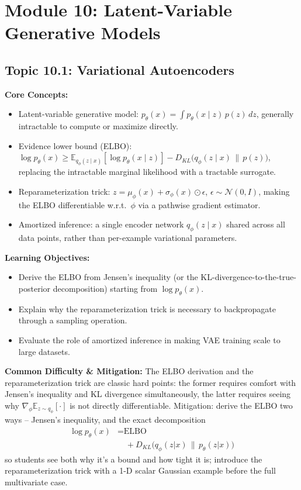 \documentclass[11pt]{article}
\begin{document}
\section{Module 10: Latent-Variable Generative Models}

\subsection{Topic 10.1: Variational Autoencoders}

\textbf{Core Concepts:}
\begin{itemize}
  \item Latent-variable generative model: $p_\theta(x) = \int p_\theta(x\mid z)\,p(z)\,dz$, generally intractable to compute or maximize directly.
  \item Evidence lower bound (ELBO): $\log p_\theta(x) \ge \mathbb E_{q_\phi(z\mid x)}[\log p_\theta(x\mid z)] - D_{KL}\big(q_\phi(z\mid x)\,\|\,p(z)\big)$, replacing the intractable marginal likelihood with a tractable surrogate.
  \item Reparameterization trick: $z = \mu_\phi(x) + \sigma_\phi(x)\odot \epsilon$, $\epsilon\sim\mathcal N(0,I)$, making the ELBO differentiable w.r.t.\ $\phi$ via a pathwise gradient estimator.
  \item Amortized inference: a single encoder network $q_\phi(z\mid x)$ shared across all data points, rather than per-example variational parameters.
\end{itemize}

\textbf{Learning Objectives:}
\begin{itemize}
  \item Derive the ELBO from Jensen's inequality (or the KL-divergence-to-the-true-posterior decomposition) starting from $\log p_\theta(x)$.
  \item Explain why the reparameterization trick is necessary to backpropagate through a sampling operation.
  \item Evaluate the role of amortized inference in making VAE training scale to large datasets.
\end{itemize}

\textbf{Common Difficulty \& Mitigation:} The ELBO derivation and the reparameterization trick are classic hard points: the former requires comfort with Jensen's inequality and KL divergence simultaneously, the latter requires seeing why $\nabla_\phi \mathbb E_{z\sim q_\phi}[\cdot]$ is not directly differentiable. Mitigation: derive the ELBO two ways -- Jensen's inequality, and the exact decomposition
\begin{align*}
\log p_\theta(x) &= \text{ELBO} \\
&\quad + D_{KL}\big(q_\phi(z|x)\,\|\,p_\theta(z|x)\big)
\end{align*}
so students see both why it's a bound and how tight it is; introduce the reparameterization trick with a 1-D scalar Gaussian example before the full multivariate case.
\end{document}
